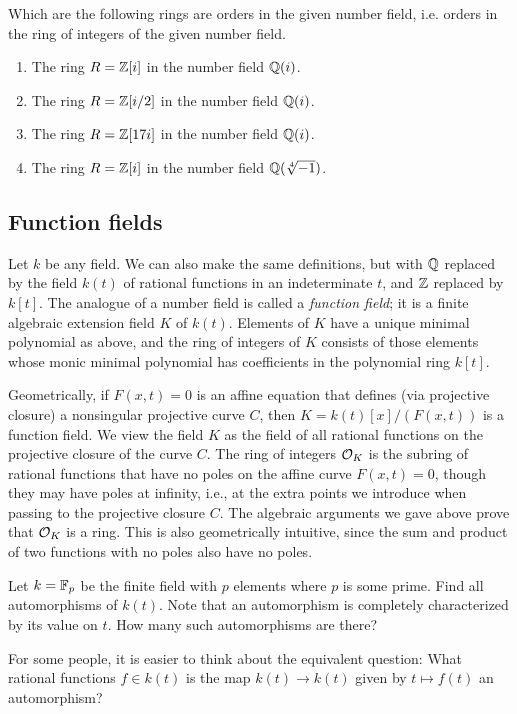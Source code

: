 \begin{exercise}
	Which are the following rings are orders in the given
	number field, i.e. orders in the ring of integers of the
	given number field.
	\begin{enumerate}
	\item The ring $R = \mathbb{Z}[i]$ in the number field $\mathbb{Q}(i)$.
	\item The ring $R = \mathbb{Z}[i/2]$ in the number field $\mathbb{Q}(i)$.
	\item The ring $R = \mathbb{Z}[17i]$ in the number field $\mathbb{Q}(i)$.
	\item The ring $R = \mathbb{Z}[i]$ in the number field $\mathbb{Q}(\sqrt[4]{-1})$.
	\end{enumerate}
\end{exercise}

\subsection{Function fields}
Let $k$ be any field.  We can also make the same definitions, but with $\mathbb{Q}$
replaced by the field $k(t)$ of rational functions in an indeterminate
$t$, and $\mathbb{Z}$ replaced by $k[t]$.
The analogue of a number field is called a {\em function field}; it is
a finite algebraic extension field $K$ of $k(t)$.  Elements of $K$
have a unique minimal polynomial as above, and the ring of integers of
$K$ consists of those elements whose monic minimal polynomial has
coefficients in the polynomial ring $k[t]$.  

Geometrically, if $F(x,t)=0$ is an affine equation that defines (via
projective closure) a nonsingular projective curve $C$, then
$K=k(t)[x]/(F(x,t))$ is a function field.  We view the field $K$ as
the field of all rational functions on the projective closure of the
curve $C$.  The ring of integers $\mathcal{O}_K$ is the subring of rational
functions that have no poles on the affine curve $F(x,t)=0$, though
they may have poles at infinity, i.e., at the extra points we
introduce when passing to the projective closure $C$.  The algebraic
arguments we gave above prove that $\mathcal{O}_K$ is a ring.  This is also
geometrically intuitive, since the sum and product of two functions
with no poles also have no poles.

\begin{exercise}
	Let $k = \mathbb{F}_p$ be the finite field with $p$ elements where $p$ is some prime. Find all automorphisms of $k(t)$. Note that an automorphism is completely characterized by its value on $t$. How many such automorphisms are there?
	
	\begin{hint}
		For some people, it is easier to think about the equivalent question: What rational functions $f\in k(t)$ is the map $k(t)\to k(t)$ given by $t\mapsto f(t)$ an automorphism?
	\end{hint}
\end{exercise}

